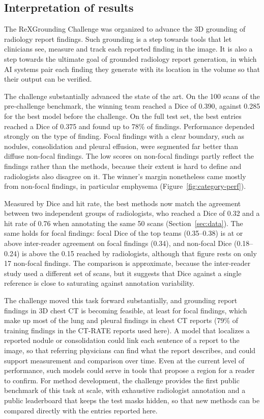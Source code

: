 \documentclass[final,5p,times,twocolumn,authoryear,numafflabel]{elsarticle}
\begin{document}
\subsection{Interpretation of results}
The ReXGrounding Challenge was organized to advance the 3D grounding of
radiology report findings. Such grounding is a step towards tools that let
clinicians see, measure and track each reported finding in the image. It is also
a step towards the ultimate goal of grounded radiology report generation, in
which AI systems pair each finding they generate with its location in the volume
so that their output can be verified.

The challenge substantially advanced the state of the art. On the 100
scans of the pre-challenge benchmark, the winning team reached a Dice of
0.390, against 0.285 for the best model before the challenge. On the
full test set, the best entries reached a Dice of 0.375 and found up to
78\% of findings. Performance depended strongly on
the type of finding. Focal findings with a clear boundary, such as nodules,
consolidation and pleural effusion, were segmented far better than diffuse
non-focal findings. The low scores on non-focal findings partly reflect the
findings rather than the methods, because their extent is hard to define and
radiologists also disagree on it. The winner's margin nonetheless came mostly
from non-focal findings, in particular emphysema (Figure~\ref{fig:category-perf}).

Measured by Dice and hit rate, the best methods now match the agreement between
two independent groups of radiologists, who reached a Dice of 0.32 and a
hit rate of 0.76 when annotating the same 50 scans
(Section~\ref{sec:data}). The same holds for focal findings: focal Dice of the
top teams (0.35--0.38) is at or above inter-reader agreement on focal
findings (0.34), and non-focal Dice (0.18--0.24) is above the
0.15 reached by radiologists, although that figure rests on only 17
non-focal findings. The comparison is approximate, because the
inter-reader study used a different set of scans, but it suggests that Dice
against a single reference is close to saturating against annotation
variability.

The challenge moved this task forward substantially, and grounding report
findings in 3D chest CT is becoming feasible, at least for focal findings, which
make up most of the lung and pleural findings in chest CT reports (79\% of
training findings in the CT-RATE reports used here). A model that localizes a reported nodule or
consolidation could link each sentence of a report to the image, so that
referring physicians can find what the report describes, and could support
measurement and comparison over time. Even at the current level of performance,
such models could serve in tools that propose a region for a reader to confirm.
For method development, the challenge provides the first public benchmark of
this task at scale, with exhaustive radiologist annotation and a public
leaderboard that keeps the test masks hidden, so that new methods can be
compared directly with the entries reported here.
\end{document}

